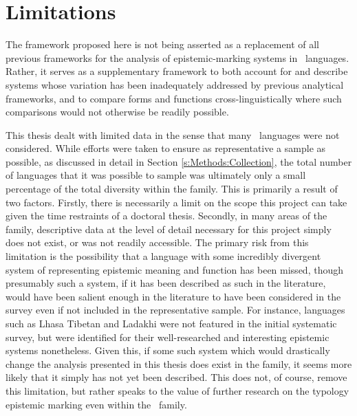 \section{Limitations}
The framework proposed here is not being asserted as a replacement of all previous frameworks for the analysis of epistemic-marking systems in \lfam\ languages. Rather, it serves as a supplementary framework to both account for and describe systems whose variation has been inadequately addressed by previous analytical frameworks, and to compare forms and functions cross-linguistically where such comparisons would not otherwise be readily possible.

This thesis dealt with limited data in the sense that many \lfam\ languages were not considered. While efforts were taken to ensure as representative a sample as possible, as discussed in detail in Section \ref{s:Methods:Collection}, the total number of languages that it was possible to sample was ultimately only a small percentage of the total diversity within the family. This is primarily a result of two factors. Firstly, there is necessarily a limit on the scope this project can take given the time restraints of a doctoral thesis. Secondly, in many areas of the family, descriptive data at the level of detail necessary for this project simply does not exist, or was not readily accessible. The primary risk from this limitation is the possibility that a language with some incredibly divergent system of representing epistemic meaning and function has been missed, though presumably such a system, if it has been described as such in the literature, would have been salient enough in the literature to have been considered in the survey even if not included in the representative sample. For instance, languages such as Lhasa Tibetan and Ladakhi were not featured in the initial systematic survey, but were identified for their well-researched and interesting epistemic systems nonetheless. Given this, if some such system which would drastically change the analysis presented in this thesis does exist in the family, it seems more likely that it simply has not yet been described. This does not, of course, remove this limitation, but rather speaks to the value of further research on the typology epistemic marking even within the \lfam\ family.

